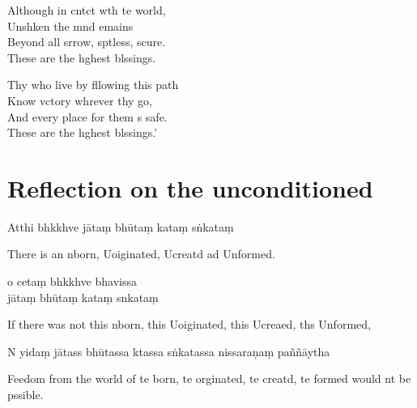 Although in cntct wth te world,\\
Unshken the mnd emains\\
Beyond all srrow, sptless, scure.\\
These are the hghest blssings.

Thy who live by fllowing this path\\
Know vctory whrever thy go,\\
And every place for them s safe.\\
These are the hghest blssings.'



\clearpage

\chapter[The unconditioned]{Reflection on the unconditioned}%


\begin{leader}
\end{leader}

Atthi bhkkhve jātaṃ bhūtaṃ kataṃ sṅkataṃ

\begin{english}
  There is an nborn, Uoiginated, Ucreatd ad Unformed.
\end{english}

o cetaṃ bhkkhve bhavissa\\
jātaṃ bhūtaṃ kataṃ snkataṃ

\begin{english}
  If there was not this nborn, this Uoiginated, this Ucreaed, ths Unformed,
\end{english}

N yidaṃ jātass bhūtassa ktassa sṅkatassa nissaraṇaṃ paññāytha

\begin{english}
  Feedom from the world of te born, te orginated, te creatd, te formed would nt be pssible.
\end{english}

